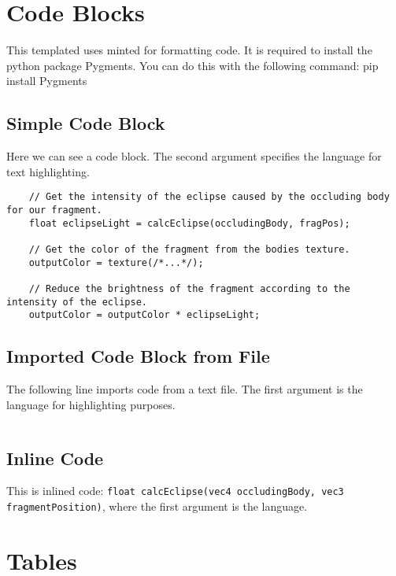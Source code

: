 \section{Code Blocks}\label{sec:code-blocks}

This templated uses minted for formatting code.
It is required to install the python package Pygments.
You can do this with the following command: pip install Pygments

\subsection{Simple Code Block}\label{subsec:simple-code-block}

Here we can see a code block.
The second argument specifies the language for text highlighting.

\begin{verbatim}
    // Get the intensity of the eclipse caused by the occluding body for our fragment.
    float eclipseLight = calcEclipse(occludingBody, fragPos);

    // Get the color of the fragment from the bodies texture.
    outputColor = texture(/*...*/);

    // Reduce the brightness of the fragment according to the intensity of the eclipse.
    outputColor = outputColor * eclipseLight;
\end{verbatim}

\subsection{Imported Code Block from File}\label{subsec:imported-code-block-from-file}

The following line imports code from a text file.
The first argument is the language for highlighting purposes.

\inputminted{c}{chapter02/code/spherical_cap_intersect.glsl}

\subsection{Inline Code}\label{subsec:inline-code}

This is inlined code: \texttt{float calcEclipse(vec4 occludingBody, vec3 fragmentPosition)}, where the first argument is the language.

\section{Tables}\label{sec:tables}

